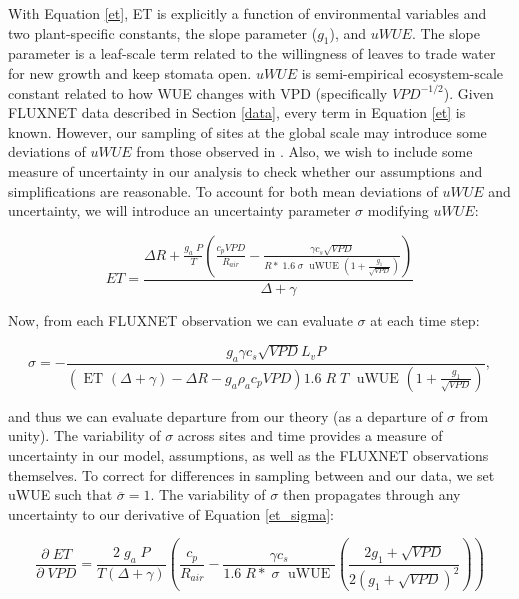 \documentclass[draft,linenumbers]{agujournal}
\begin{document}
With Equation \ref{et}, ET is explicitly a function of environmental variables and two plant-specific constants, the slope parameter ($g_1$), and $uWUE$. The slope parameter is a leaf-scale term related to the willingness of leaves to trade water for new growth and keep stomata open. $uWUE$ is semi-empirical ecosystem-scale constant related to how WUE changes with VPD (specifically $VPD^{-1/2}$). Given FLUXNET data described in Section \ref{data}, every term in Equation \ref{et} is known. However, our sampling of sites at the global scale may introduce some deviations of $uWUE$ from those observed in \citet{Zhou_2015}. Also, we wish to include some measure of uncertainty in our analysis to check whether our assumptions and simplifications are reasonable. To account for both mean deviations of $uWUE$ and uncertainty, we will introduce an uncertainty parameter $\sigma$ modifying $uWUE$:

\begin{linenomath*}
  \begin{equation}
    ET = \frac{\Delta R + \frac{g_a\; P}{T} \left( \frac{ c_p VPD}{R_{air}} -  \frac{\gamma c_s \sqrt{VPD} }{ R* \; 1.6\; \sigma \; \text{ uWUE } (1 + \frac{g_1}{\sqrt{VPD}})} \right) }{ \Delta + \gamma}
    \label{et_sigma}
  \end{equation}
\end{linenomath*}

Now, from each FLUXNET observation we can evaluate $\sigma$ at each time step:

\begin{linenomath*}
  \begin{equation}
\sigma = - \frac{g_a \gamma c_s \sqrt{VPD} L_v P }{ \left(\text{ ET } ( \Delta + \gamma) - \Delta R - g_a \rho_a c_p VPD\right) 1.6 \; R\; T\; \text{ uWUE } (1 + \frac{g_1}{\sqrt{VPD}})},
    \label{sigma}
  \end{equation}
\end{linenomath*}

and thus we can evaluate departure from our theory (as a departure of $\sigma$ from unity). The variability of $\sigma$ across sites and time provides a measure of uncertainty in our model, assumptions, as well as the FLUXNET observations themselves. To correct for differences in sampling between \cite{Zhou_2015} and our data, we set uWUE such that $\overline{\sigma} = 1$. The variability of $\sigma$ then propagates through any uncertainty to our derivative of Equation \ref{et_sigma}:

\begin{linenomath*}
  \begin{equation}
    \frac{\partial \;  ET}{\partial \; VPD} = \frac{2\; g_a \; P}{T(\Delta + \gamma)}   \left(\frac{ c_p}{R_{air}} -  \frac{\gamma c_s }{1.6 \; R*\; \sigma \; \text{ uWUE }} \left( \frac{2 g_1 + \sqrt{VPD}}{2 (g_1 + \sqrt{VPD})^2}\right) \right)
    \label{d_et}
  \end{equation}
\end{linenomath*}
\end{document}
